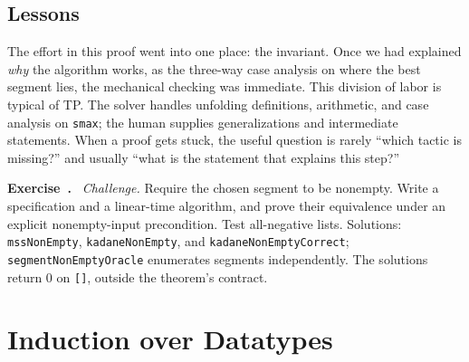 \documentclass[acmsmall,screen,review,anonymous,nonacm]{acmart}
\newcommand{\code}[1]{\texttt{#1}}
\newcounter{exercise}
\newenvironment{exercise}{\refstepcounter{exercise}\par\medskip\noindent
  \textbf{Exercise~\theexercise.}\ }{\par\medskip}
\begin{document}
\subsection{Lessons}

The effort in this proof went into one place: the invariant. Once we had
explained \emph{why} the algorithm works, as the three-way case analysis on where
the best segment lies, the mechanical checking was immediate. This division of
labor is typical of TP. The solver handles unfolding definitions, arithmetic,
and case analysis on \code{smax}; the human supplies generalizations and
intermediate statements. When a proof gets stuck, the useful question is
rarely ``which tactic is missing?'' and usually ``what is the statement that
explains this step?''

\begin{exercise}
\emph{Challenge.} Require the chosen segment to be nonempty. Write a
specification and a linear-time algorithm, and prove their equivalence under
an explicit nonempty-input precondition. Test all-negative lists.
Solutions: \code{mssNonEmpty}, \code{kadaneNonEmpty}, and
\code{kadaneNonEmptyCorrect}; \code{segmentNonEmptyOracle} enumerates segments
independently. The solutions return 0 on \code{[]}, outside the theorem's contract.
\end{exercise}

\section{Induction over Datatypes}
\label{sec:datatype-induction}
\end{document}

